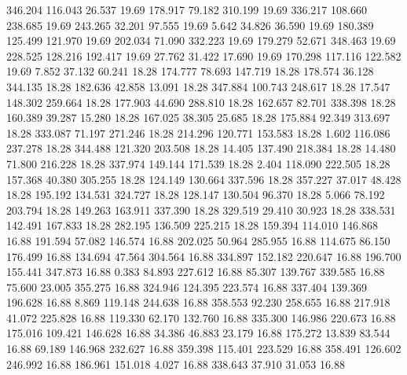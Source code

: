  346.204  116.043   26.537        19.69
 178.917   79.182  310.199        19.69
 336.217  108.660  238.685        19.69
 243.265   32.201   97.555        19.69
   5.642   34.826   36.590        19.69
 180.389  125.499  121.970        19.69
 202.034   71.090  332.223        19.69
 179.279   52.671  348.463        19.69
 228.525  128.216  192.417        19.69
  27.762   31.422   17.690        19.69
 170.298  117.116  122.582        19.69
   7.852   37.132   60.241        18.28
 174.777   78.693  147.719        18.28
 178.574   36.128  344.135        18.28
 182.636   42.858   13.091        18.28
 347.884  100.743  248.617        18.28
  17.547  148.302  259.664        18.28
 177.903   44.690  288.810        18.28
 162.657   82.701  338.398        18.28
 160.389   39.287   15.280        18.28
 167.025   38.305   25.685        18.28
 175.884   92.349  313.697        18.28
 333.087   71.197  271.246        18.28
 214.296  120.771  153.583        18.28
   1.602  116.086  237.278        18.28
 344.488  121.320  203.508        18.28
  14.405  137.490  218.384        18.28
  14.480   71.800  216.228        18.28
 337.974  149.144  171.539        18.28
   2.404  118.090  222.505        18.28
 157.368   40.380  305.255        18.28
 124.149  130.664  337.596        18.28
 357.227   37.017   48.428        18.28
 195.192  134.531  324.727        18.28
 128.147  130.504   96.370        18.28
   5.066   78.192  203.794        18.28
 149.263  163.911  337.390        18.28
 329.519   29.410   30.923        18.28
 338.531  142.491  167.833        18.28
 282.195  136.509  225.215        18.28
 159.394  114.010  146.868        16.88
 191.594   57.082  146.574        16.88
 202.025   50.964  285.955        16.88
 114.675   86.150  176.499        16.88
 134.694   47.564  304.564        16.88
 334.897  152.182  220.647        16.88
 196.700  155.441  347.873        16.88
   0.383   84.893  227.612        16.88
  85.307  139.767  339.585        16.88
  75.600   23.005  355.275        16.88
 324.946  124.395  223.574        16.88
 337.404  139.369  196.628        16.88
   8.869  119.148  244.638        16.88
 358.553   92.230  258.655        16.88
 217.918   41.072  225.828        16.88
 119.330   62.170  132.760        16.88
 335.300  146.986  220.673        16.88
 175.016  109.421  146.628        16.88
  34.386   46.883   23.179        16.88
 175.272   13.839   83.544        16.88
  69.189  146.968  232.627        16.88
 359.398  115.401  223.529        16.88
 358.491  126.602  246.992        16.88
 186.961  151.018    4.027        16.88
 338.643   37.910   31.053        16.88
